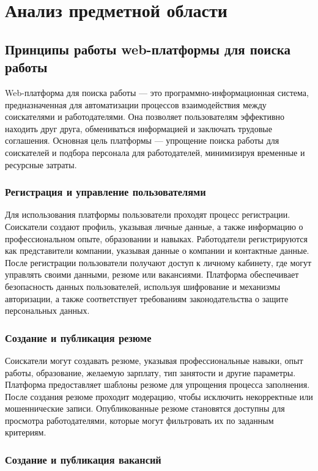 \section{Анализ предметной области}
\subsection{Принципы работы web-платформы для поиска работы}

Web-платформа для поиска работы — это программно-информационная система, предназначенная для автоматизации процессов взаимодействия между соискателями и работодателями. Она позволяет пользователям эффективно находить друг друга, обмениваться информацией и заключать трудовые соглашения. Основная цель платформы — упрощение поиска работы для соискателей и подбора персонала для работодателей, минимизируя временные и ресурсные затраты.

\subsubsection{Регистрация и управление пользователями}

Для использования платформы пользователи проходят процесс регистрации. Соискатели создают профиль, указывая личные данные, а также информацию о профессиональном опыте, образовании и навыках. Работодатели регистрируются как представители компании, указывая данные о компании и контактные данные. После регистрации пользователи получают доступ к личному кабинету, где могут управлять своими данными, резюме или вакансиями. Платформа обеспечивает безопасность данных пользователей, используя шифрование и механизмы авторизации, а также соответствует требованиям законодательства о защите персональных данных.

\subsubsection{Создание и публикация резюме}

Соискатели могут создавать резюме, указывая профессиональные навыки, опыт работы, образование, желаемую зарплату, тип занятости и другие параметры. Платформа предоставляет шаблоны резюме для упрощения процесса заполнения. После создания резюме проходит модерацию, чтобы исключить некорректные или мошеннические записи. Опубликованные резюме становятся доступны для просмотра работодателями, которые могут фильтровать их по заданным критериям.

\subsubsection{Создание и публикация вакансий}


